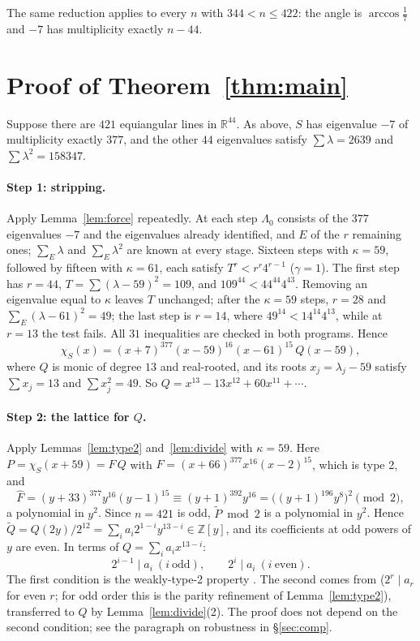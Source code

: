 \documentclass[11pt]{article}
\theoremstyle{definition}
\newcommand{\Z}{\mathbb{Z}}
\newcommand{\R}{\mathbb{R}}
\begin{document}
The same reduction applies to every $n$ with $344<n\le422$: the angle is $\arccos\frac17$ and $-7$
has multiplicity exactly $n-44$.

\section{Proof of Theorem~\ref{thm:main}}\label{sec:421}

Suppose there are $421$ equiangular lines in $\R^{44}$. As above, $S$ has eigenvalue $-7$ of
multiplicity exactly $377$, and the other $44$ eigenvalues satisfy $\sum\lambda=2639$ and
$\sum\lambda^2=158347$.

\paragraph{Step 1: stripping.} Apply Lemma~\ref{lem:force} repeatedly. At each step $\Lambda_0$
consists of the $377$ eigenvalues $-7$ and the eigenvalues already identified, and $E$ of the $r$
remaining ones; $\sum_E\lambda$ and $\sum_E\lambda^2$ are known at every stage. Sixteen steps with
$\kappa=59$, followed by fifteen with $\kappa=61$, each satisfy $T^r<r^r4^{r-1}$ ($\gamma=1$). The
first step has $r=44$, $T=\sum(\lambda-59)^2=109$, and $109^{44}<44^{44}4^{43}$. Removing an
eigenvalue equal to $\kappa$ leaves $T$ unchanged; after the $\kappa=59$ steps, $r=28$ and
$\sum_E(\lambda-61)^2=49$; the last step is $r=14$, where $49^{14}<14^{14}4^{13}$, while at $r=13$
the test fails. All $31$ inequalities are checked in both programs. Hence
\[
\chi_S(x)=(x+7)^{377}(x-59)^{16}(x-61)^{15}\,Q(x-59),
\]
where $Q$ is monic of degree $13$ and real-rooted, and its roots $x_j=\lambda_j-59$ satisfy
$\sum x_j=13$ and $\sum x_j^2=49$. So $Q=x^{13}-13x^{12}+60x^{11}+\cdots$.

\paragraph{Step 2: the lattice for $Q$.} Apply Lemmas~\ref{lem:type2} and~\ref{lem:divide} with
$\kappa=59$. Here $P=\chi_S(x+59)=F\,Q$ with $F=(x+66)^{377}x^{16}(x-2)^{15}$, which is type 2, and
\[
\widehat F=(y+33)^{377}y^{16}(y-1)^{15}\equiv(y+1)^{392}y^{16}=\bigl((y+1)^{196}y^{8}\bigr)^2\pmod 2,
\]
a polynomial in $y^2$. Since $n=421$ is odd, $\widetilde P\bmod2$ is a polynomial in $y^2$. Hence
$\widetilde Q=Q(2y)/2^{12}=\sum_i a_i2^{1-i}y^{13-i}\in\Z[y]$, and its coefficients at odd powers of $y$
are even. In terms of $Q=\sum_ia_ix^{13-i}$:
\[
2^{i-1}\mid a_i\ (i\ \text{odd}),\qquad 2^{i}\mid a_i\ (i\ \text{even}).
\]
The first condition is the weakly-type-2 property \cite[Lemma~2.7]{GSY21}. The second comes from
\cite[Lemma~3.8]{GY19} ($2^r\mid a_r$ for even $r$; for odd order this is the parity refinement of
Lemma~\ref{lem:type2}), transferred to $Q$ by Lemma~\ref{lem:divide}(2). The proof does not depend
on the second condition; see the paragraph on robustness in \S\ref{sec:comp}.
\end{document}
